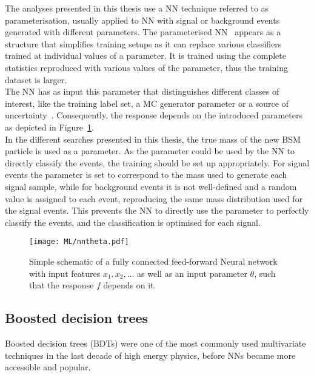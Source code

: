 The analyses presented in this thesis use a NN technique referred to as parameterisation, usually applied to NN with signal or background events generated with different parameters. The parameterised NN~\cite{Baldi_2016} appears as a structure that simplifies training setups as it can replace various classifiers trained at individual values of a parameter. It is trained using the complete statistics reproduced with various values of the parameter, thus the training dataset is larger.\\

The NN has as input this parameter that distinguishes different classes of interest, like the training label set, a MC generator parameter or a source of uncertainty~\cite{Ghosh_2021}. Consequently, the response depends on the introduced parameters as depicted in Figure~\ref{ML:PNN}.\\

In the different searches presented in this thesis, the true mass of the new BSM particle is used as a parameter. As the parameter could be used by the NN to directly classify the events, the training should be set up appropriately. For signal events the parameter is set to correspond to the mass used to generate each signal sample, while for background events it is not well-defined and a random value is assigned to each event, reproducing the same mass distribution used for the signal events. This prevents the NN to directly use the parameter to perfectly classify the events, and the classification is optimised for each signal.

\begin{figure}[htbp]
    \RawFloats
    \begin{center}
    \texttt{[image: ML/nntheta.pdf]}
    \caption{
        Simple schematic of a fully connected feed-forward Neural network with input features $x_1, x_2,...$ as well as an input parameter $\theta$, such that the response $f$ depends on it.
    }
    \label{ML:PNN}
    \end{center}
\end{figure}

\subsection{Boosted decision trees}

Boosted decision trees (BDTs) were one of the most commonly used multivariate techniques in the last decade of high energy physics, before NNs became more accessible and popular. \\

